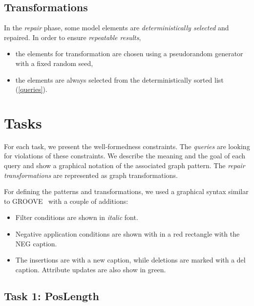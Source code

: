 \documentclass[submission,copyright,creativecommons]{eptcs}
\begin{document}
\subsection{Transformations}
\label{transformations}

In the \emph{repair} phase, some model elements are \emph{deterministically selected} and repaired. In order to ensure \emph{repeatable results},

\begin{itemize}
  \item the elements for transformation are chosen using a pseudorandom generator with a fixed random seed,
  \item the elements are always selected from the deterministically sorted list (\autoref{queries}).
\end{itemize}

\section{Tasks}
\label{tasks}

For each task, we present the well-formedness constraints. The \emph{queries} are looking for violations of these constraints. We describe the meaning and the goal of each query and show a graphical notation of the associated graph pattern. The \emph{repair transformations} are represented as graph transformations.

For defining the patterns and transformations, we used a graphical syntax similar to GROOVE~\cite{rensink2004groove} with a couple of additions:

\begin{itemize}
  \item Filter conditions are shown in \textit{italic} font.
  \item Negative application conditions are shown with in a \textcolor{negcolor}{red} rectangle with the \textcolor{negcolor}{\textsf{NEG}} caption.
  \item The insertions are with a \textcolor{newcolor}{\guillemotleft{}new\guillemotright{}} caption, while deletions are marked with a \textcolor{delcolor}{\guillemotleft{}del\guillemotright{}} caption. Attribute updates are also show in \textcolor{newcolor}{green}.
\end{itemize}

\subsection{Task 1: PosLength}
\label{poslength}
\end{document}
